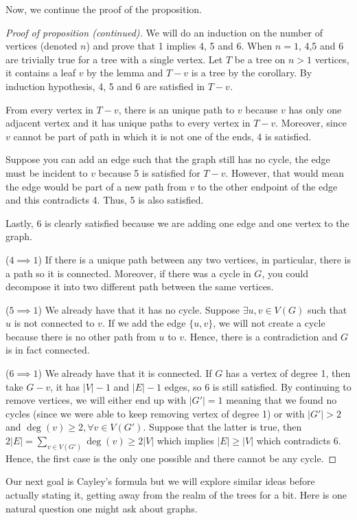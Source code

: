 \documentclass{tufte-handout}
\theoremstyle{definition}
\theoremstyle{remark}
\begin{document}
Now, we continue the proof of the proposition.
\begin{proof}[Proof of proposition (continued)]
	We will do an induction on the number of vertices (denoted $n$) and prove that 1 implies 4, 5 and 6. When $n=1$, 4,5 and 6 are trivially true for a tree with a single vertex. Let $T$ be a tree on $n > 1$ vertices, it contains a leaf $v$ by the lemma and $T-v$ is a tree by the corollary. By induction hypothesis, 4, 5 and 6 are satisfied in $T-v$.
	
	From every vertex in $T-v$, there is an unique path to $v$ because $v$ has only one adjacent vertex and it has unique paths to every vertex in $T-v$. Moreover, since $v$ cannot be part of path in which it is not one of the ends, 4 is satisfied.
	
	Suppose you can add an edge such that the graph still has no cycle, the edge must be incident to $v$ because 5 is satisfied for $T-v$. However, that would mean the edge would be part of a new path from $v$ to the other endpoint of the edge and this contradicts 4. Thus, 5 is also satisfied.
	
	Lastly, 6 is clearly satisfied because we are adding one edge and one vertex to the graph.
	
	($4 \implies 1$) If there is a unique path between any two vertices, in particular, there is a path so it is connected. Moreover, if there was a cycle in $G$, you could decompose it into two different path between the same vertices.
	
	($5 \implies 1$) We already have that it has no cycle. Suppose $\exists u,v \in V(G)$ such that $u$ is not connected to $v$. If we add the edge $\{u,v\}$, we will not create a cycle because there is no other path from $u$ to $v$. Hence, there is a contradiction and $G$ is in fact connected.
	
	($6 \implies 1$) We already have that it is connected. If $G$ has a vertex of degree 1, then take $G-v$, it has $|V| - 1$ and $|E| - 1$ edges, so 6 is still satisfied. By continuing to remove vertices, we will either end up with $|G'| = 1$ meaning that we found no cycles (since we were able to keep removing vertex of degree 1) or with $|G'| > 2$ and $\deg{(v)} \geq 2, \forall v \in V(G')$. Suppose that the latter is true, then $2|E| = \sum_{v \in V(G')} \deg{(v)} \geq 2|V|$ which implies $|E| \geq |V|$ which contradicts 6. Hence, the first case is the only one possible and there cannot be any cycle.
\end{proof}

Our next goal is Cayley's formula but we will explore similar ideas before actually stating it, getting away from the realm of the trees for a bit. Here is one natural question one might ask about graphs.
\end{document}
